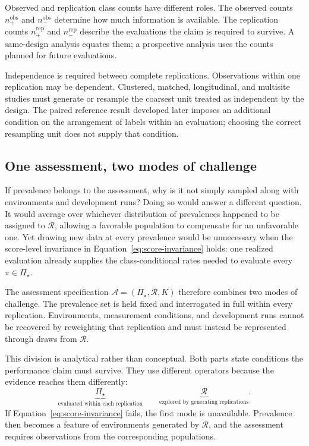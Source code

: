 \documentclass[11pt]{article}
\newcommand{\Regime}{\mathcal{R}}
\newcommand{\Assess}{\mathcal{A}}
\newcommand{\PSet}{\Pi_\star}
\theoremstyle{remark}
\begin{document}
Observed and replication class counts have different roles. The observed counts $n_+^{\mathrm{obs}}$ and $n_-^{\mathrm{obs}}$ determine how much information is available. The replication counts $n_+^{\mathrm{rep}}$ and $n_-^{\mathrm{rep}}$ describe the evaluations the claim is required to survive. A same-design analysis equates them; a prospective analysis uses the counts planned for future evaluations.

Independence is required between complete replications. Observations within one replication may be dependent. Clustered, matched, longitudinal, and multisite studies must generate or resample the coarsest unit treated as independent by the design. The paired reference result developed later imposes an additional condition on the arrangement of labels within an evaluation; choosing the correct resampling unit does not supply that condition.

\subsection{One assessment, two modes of challenge}

If prevalence belongs to the assessment, why is it not simply sampled along with environments and development runs? Doing so would answer a different question. It would average over whichever distribution of prevalences happened to be assigned to $\Regime$, allowing a favorable population to compensate for an unfavorable one. Yet drawing new data at every prevalence would be unnecessary when the score-level invariance in Equation~\eqref{eq:score-invariance} holds: one realized evaluation already supplies the class-conditional rates needed to evaluate every $\pi\in\PSet$.

The assessment specification $\Assess=(\PSet,\Regime,K)$ therefore combines two modes of challenge. The prevalence set is held fixed and interrogated in full within every replication. Environments, measurement conditions, and development runs cannot be recovered by reweighting that replication and must instead be represented through draws from $\Regime$.

This division is analytical rather than conceptual. Both parts state conditions the performance claim must survive. They use different operators because the evidence reaches them differently:
\[
\underbrace{\PSet}_{\text{evaluated within each replication}}
\qquad
\underbrace{\Regime}_{\text{explored by generating replications}}.
\]
If Equation~\eqref{eq:score-invariance} fails, the first mode is unavailable. Prevalence then becomes a feature of environments generated by $\Regime$, and the assessment requires observations from the corresponding populations.
\end{document}
